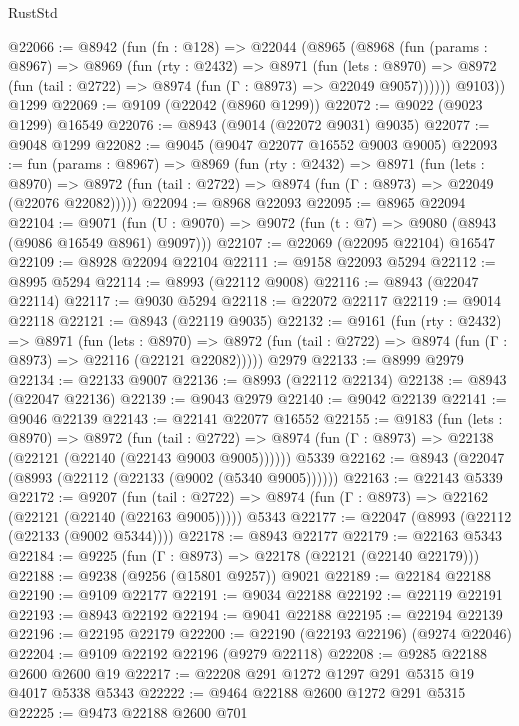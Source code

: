 \begin{lexlean}{RustStd}
\begin{coremodule}
@22066 := @8942
    (fun (fn : @128) =>
    @22044
      (@8965
        (@8968
          (fun (params : @8967) =>
          @8969
            (fun (rty : @2432) =>
            @8971
              (fun (lets : @8970) =>
              @8972 (fun (tail : @2722) => @8974 (fun (Γ : @8973) => @22049 @9057))))))
        @9103))
    @1299
@22069 := @9109 (@22042 (@8960 @1299))
@22072 := @9022 (@9023 @1299) @16549
@22076 := @8943 (@9014 (@22072 @9031) @9035)
@22077 := @9048 @1299
@22082 := @9045 (@9047 @22077 @16552 @9003 @9005)
@22093 := fun (params : @8967) =>
  @8969
    (fun (rty : @2432) =>
    @8971
      (fun (lets : @8970) =>
      @8972 (fun (tail : @2722) => @8974 (fun (Γ : @8973) => @22049 (@22076 @22082)))))
@22094 := @8968 @22093
@22095 := @8965 @22094
@22104 := @9071
    (fun (U : @9070) => @9072 (fun (t : @7) => @9080 (@8943 (@9086 @16549 @8961) @9097)))
@22107 := @22069 (@22095 @22104) @16547
@22109 := @8928 @22094 @22104
@22111 := @9158 @22093 @5294
@22112 := @8995 @5294
@22114 := @8993 (@22112 @9008)
@22116 := @8943 (@22047 @22114)
@22117 := @9030 @5294
@22118 := @22072 @22117
@22119 := @9014 @22118
@22121 := @8943 (@22119 @9035)
@22132 := @9161
    (fun (rty : @2432) =>
    @8971
      (fun (lets : @8970) =>
      @8972 (fun (tail : @2722) => @8974 (fun (Γ : @8973) => @22116 (@22121 @22082)))))
    @2979
@22133 := @8999 @2979
@22134 := @22133 @9007
@22136 := @8993 (@22112 @22134)
@22138 := @8943 (@22047 @22136)
@22139 := @9043 @2979
@22140 := @9042 @22139
@22141 := @9046 @22139
@22143 := @22141 @22077 @16552
@22155 := @9183
    (fun (lets : @8970) =>
    @8972
      (fun (tail : @2722) =>
      @8974 (fun (Γ : @8973) => @22138 (@22121 (@22140 (@22143 @9003 @9005))))))
    @5339
@22162 := @8943 (@22047 (@8993 (@22112 (@22133 (@9002 (@5340 @9005))))))
@22163 := @22143 @5339
@22172 := @9207
    (fun (tail : @2722) => @8974 (fun (Γ : @8973) => @22162 (@22121 (@22140 (@22163 @9005)))))
    @5343
@22177 := @22047 (@8993 (@22112 (@22133 (@9002 @5344))))
@22178 := @8943 @22177
@22179 := @22163 @5343
@22184 := @9225 (fun (Γ : @8973) => @22178 (@22121 (@22140 @22179)))
@22188 := @9238 (@9256 (@15801 @9257)) @9021
@22189 := @22184 @22188
@22190 := @9109 @22177
@22191 := @9034 @22188
@22192 := @22119 @22191
@22193 := @8943 @22192
@22194 := @9041 @22188
@22195 := @22194 @22139
@22196 := @22195 @22179
@22200 := @22190 (@22193 @22196) (@9274 @22046)
@22204 := @9109 @22192 @22196 (@9279 @22118)
@22208 := @9285 @22188 @2600 @2600 @19
@22217 := @22208 @291 @1272 @1297 @291 @5315 @19 @4017 @5338 @5343
@22222 := @9464 @22188 @2600 @1272 @291 @5315
@22225 := @9473 @22188 @2600 @701

\end{coremodule}
\end{lexlean}
